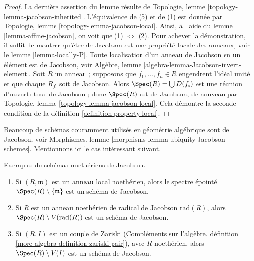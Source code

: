 \begin{proof}
La dernière assertion du lemme résulte de
Topologie, lemme \ref{topology-lemma-jacobson-inherited}.
L'équivalence de (5) et de (1) est donnée par
Topologie, lemme \ref{topology-lemma-jacobson-local}.
Ainsi, à l'aide du lemme \ref{lemma-affine-jacobson},
on voit que (1) $\Leftrightarrow$ (2).
Pour achever la démonstration, il suffit de montrer qu'être de Jacobson
est une propriété locale des anneaux, voir le lemme \ref{lemma-locally-P}.
Toute localisation d'un anneau de Jacobson en un élément est de Jacobson, voir
Algèbre, lemme \ref{algebra-lemma-Jacobson-invert-element}.
Soit $R$ un anneau ; supposons que $f_1, \ldots, f_n \in R$ engendrent l'idéal
unité et que chaque $R_{f_i}$ soit de Jacobson. Alors
$\Spec(R) = \bigcup D(f_i)$ est une réunion d'ouverts
tous de Jacobson ; donc $\Spec(R)$ est de Jacobson,
de nouveau par Topologie, lemme \ref{topology-lemma-jacobson-local}.
Cela démontre la seconde condition de la définition \ref{definition-property-local}.
\end{proof}

\noindent
Beaucoup de schémas couramment utilisés en géométrie algébrique sont de Jacobson, voir
Morphismes, lemme \ref{morphisms-lemma-ubiquity-Jacobson-schemes}.
Mentionnons ici le cas intéressant suivant.

\begin{lemma}
\label{lemma-complement-closed-point-Jacobson}
Exemples de schémas noethériens de Jacobson.
\begin{enumerate}
\item Si $(R, \mathfrak m)$ est un anneau local noethérien, alors
le spectre épointé $\Spec(R) \setminus \{\mathfrak m\}$
est un schéma de Jacobson.
\item Si $R$ est un anneau noethérien de radical de Jacobson $\text{rad}(R)$,
alors $\Spec(R) \setminus V(\text{rad}(R))$ est un schéma de Jacobson.
\item Si $(R, I)$ est un couple de Zariski (Compléments sur l'algèbre, définition
\ref{more-algebra-definition-zariski-pair}),
avec $R$ noethérien, alors $\Spec(R) \setminus V(I)$ est un
schéma de Jacobson.
\end{enumerate}
\end{lemma}

